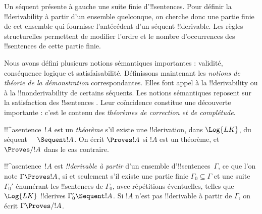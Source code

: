 \documentclass[../../../include/open-logic-section]{subfiles}
\begin{document}
      {}
      {}


Un séquent présente à gauche une suite finie d'!!{sentence}s.
Pour définir la !!{derivability} à partir d'un ensemble quelconque,
on cherche donc une partie finie de cet ensemble qui fournisse
l'antécédent d'un séquent !!{derivable}. Les règles structurelles
permettent de modifier l'ordre et le nombre d'occurrences des
!!{sentence}s de cette partie finie.

\begin{explain}
Nous avons défini plusieurs notions sémantiques importantes : validité,
conséquence logique et satisfaisabilité. Définissons maintenant les
\emph{notions de théorie de la démonstration} correspondantes.
Elles font appel à la !!{derivability} ou à la !!{nonderivability}
de certains séquents. Les notions sémantiques reposent sur la satisfaction
des !!{sentence}s . Leur coïncidence constitue une
découverte importante : c'est le contenu des \emph{théorèmes de
correction et de complétude}.
\end{explain}

\begin{defn}[Théorèmes]
!!^a{sentence}~$!A$ est un \emph{théorème} s'il existe une
!!{derivation}, dans $\Log{LK}$, du séquent $\quad \Sequent !A$.
On écrit $\Proves !A$ si $!A$ est un théorème, et $\Proves/ !A$
dans le cas contraire.
\end{defn}

\begin{defn}[!!^{derivability}]
!!^a{sentence}~$!A$ est \emph{!!{derivable} à partir} d'un ensemble
d'!!{sentence}s~$\Gamma$, ce que l'on note $\Gamma \Proves !A$,
si et seulement s'il existe une partie finie $\Gamma_0 \subseteq \Gamma$
et une suite $\Gamma_0'$ énumérant les !!{sentence}s de $\Gamma_0$,
avec répétitions éventuelles, telles que $\Log{LK}$ !!{derive}s
$\Gamma_0' \Sequent !A$. Si $!A$ n'est pas !!{derivable} à partir
de $\Gamma$, on écrit $\Gamma \Proves/ !A$.
\end{defn}
\end{document}
